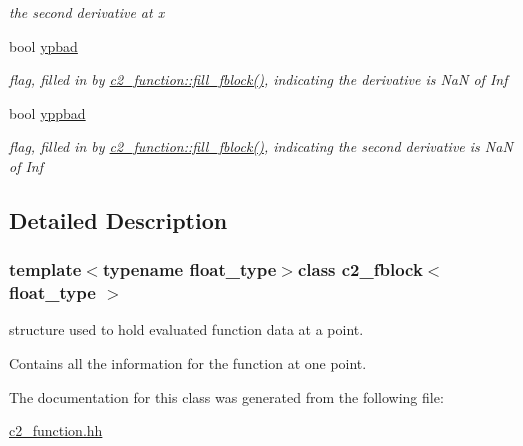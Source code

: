 \begin{DoxyCompactItemize}
\begin{DoxyCompactList}\small\item\em the second derivative at {\itshape x} \end{DoxyCompactList}\item 
\hypertarget{classc2__fblock_aa75a5d9ec9549d6fa22f6959a101de64}{bool \hyperlink{classc2__fblock_aa75a5d9ec9549d6fa22f6959a101de64}{ypbad}}\label{classc2__fblock_aa75a5d9ec9549d6fa22f6959a101de64}

\begin{DoxyCompactList}\small\item\em flag, filled in by \hyperlink{classc2__function_abdce52d0b89ff5bde13d9390ff8c2ba4}{c2\-\_\-function\-::fill\-\_\-fblock()}, indicating the derivative is Na\-N of Inf \end{DoxyCompactList}\item 
\hypertarget{classc2__fblock_ad07bac2622d2bcfeb7e7892a7db536d3}{bool \hyperlink{classc2__fblock_ad07bac2622d2bcfeb7e7892a7db536d3}{yppbad}}\label{classc2__fblock_ad07bac2622d2bcfeb7e7892a7db536d3}

\begin{DoxyCompactList}\small\item\em flag, filled in by \hyperlink{classc2__function_abdce52d0b89ff5bde13d9390ff8c2ba4}{c2\-\_\-function\-::fill\-\_\-fblock()}, indicating the second derivative is Na\-N of Inf \end{DoxyCompactList}\end{DoxyCompactItemize}


\subsection{Detailed Description}
\subsubsection*{template$<$typename float\-\_\-type$>$class c2\-\_\-fblock$<$ float\-\_\-type $>$}

structure used to hold evaluated function data at a point. 

Contains all the information for the function at one point. 

The documentation for this class was generated from the following file\-:\begin{DoxyCompactItemize}
\item 
\hyperlink{c2__function_8hh}{c2\-\_\-function.\-hh}\end{DoxyCompactItemize}
